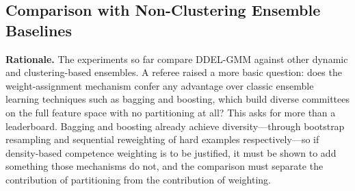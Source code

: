 \documentclass[lettersize,journal]{IEEEtran}
\newcommand{\tfourhighlight}[1]{{\color{tier4blue}#1}}
\begin{document}
		\subsection{\tfourhighlight{Comparison with Non-Clustering Ensemble Baselines}}
		
		\tfourhighlight{\noindent \textbf{Rationale.} The experiments so far compare DDEL-GMM against other dynamic and clustering-based ensembles. A referee raised a more basic question: does the weight-assignment mechanism confer any advantage over classic ensemble learning techniques such as bagging and boosting, which build diverse committees on the full feature space with no partitioning at all? This asks for more than a leaderboard. Bagging and boosting already achieve diversity---through bootstrap resampling and sequential reweighting of hard examples respectively---so if density-based competence weighting is to be justified, it must be shown to add something those mechanisms do not, and the comparison must separate the contribution of partitioning from the contribution of weighting.}
		
\end{document}
